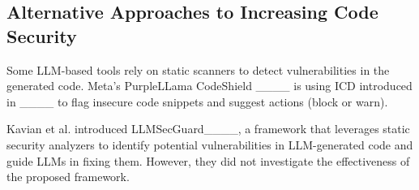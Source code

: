 \subsection{Alternative Approaches to Increasing Code Security}
Some LLM-based tools rely on static scanners to detect vulnerabilities in the generated code. Meta's PurpleLLama CodeShield ____ is using ICD introduced in ____ to flag insecure code snippets and suggest actions (block or warn).

Kavian et al. introduced LLMSecGuard____, a framework that leverages static security analyzers to identify potential vulnerabilities in LLM-generated code and guide LLMs in fixing them. However, they did not investigate the effectiveness of the proposed framework.

 

%
%
